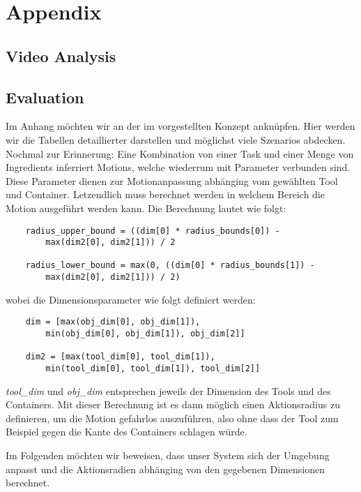 \chapter{Appendix}
\label{chap:appendix}

\section{Video Analysis}
\section{Evaluation}
Im Anhang möchten wir an der im  vorgestellten Konzept anknüpfen.
Hier werden wir die Tabellen detaillierter darstellen und möglichst viele Szenarios abdecken.
Nochmal zur Erinnerung: Eine Kombination von einer Task und einer Menge von Ingredients inferriert Motions, welche wiederrum mit Parameter verbunden sind.
Diese Parameter dienen zur Motionanpassung abhänging vom gewählten Tool und Container. 
Letzendlich muss berechnet werden in welchem Bereich die Motion ausgeführt werden kann.
Die Berechnung lautet wie folgt:
\begin{lstlisting}
    radius_upper_bound = ((dim[0] * radius_bounds[0]) - 
        max(dim2[0], dim2[1])) / 2

    radius_lower_bound = max(0, ((dim[0] * radius_bounds[1]) - 
        max(dim2[0], dim2[1])) / 2)
\end{lstlisting}
wobei die Dimensionsparameter wie folgt definiert werden: 
\begin{lstlisting}
    dim = [max(obj_dim[0], obj_dim[1]), 
        min(obj_dim[0], obj_dim[1]), obj_dim[2]]

    dim2 = [max(tool_dim[0], tool_dim[1]), 
        min(tool_dim[0], tool_dim[1]), tool_dim[2]]
\end{lstlisting}

\textit{tool\_dim} und \textit{obj\_dim} entsprechen jeweils der Dimension des Tools und des Containers.
Mit dieser Berechnung ist es dann möglich einen Aktionsradius zu definieren, um die Motion gefahrlos auszuführen, also ohne dass der Tool zum Beispiel gegen die Kante des Containers schlagen würde.

Im Folgenden möchten wir beweisen, dass unser System sich der Umgebung anpasst und die Aktionsradien abhänging von den gegebenen Dimensionen berechnet.


